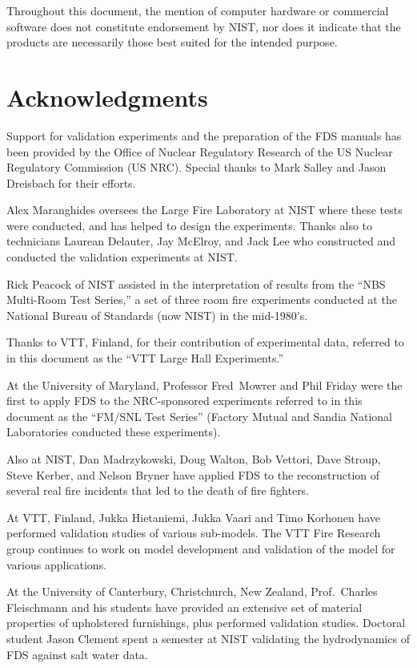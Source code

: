 \documentclass[11pt]{book}
\begin{document}
Throughout this document, the mention of computer hardware or commercial
software does not constitute endorsement by NIST, nor does it indicate that
the products are necessarily those best suited for the intended purpose.


\chapter{Acknowledgments}

\label{acksection}

Support for validation experiments and the preparation of the FDS
manuals has been provided by the Office of Nuclear Regulatory Research
of the US Nuclear Regulatory Commission (US NRC). Special thanks to
Mark Salley and Jason Dreisbach for their efforts.

Alex Maranghides oversees the Large Fire Laboratory at NIST where
these tests were conducted, and has helped to design the
experiments. Thanks also to technicians Laurean Delauter, Jay McElroy,
and Jack Lee who constructed and conducted the validation experiments
at NIST.

Rick Peacock of NIST assisted in the interpretation of results from
the ``NBS Multi-Room Test Series,'' a set of three room
fire experiments conducted at the National Bureau of Standards (now
NIST) in the mid-1980's.

Thanks to VTT, Finland, for their contribution of experimental data,
referred to in this document as the ``VTT Large Hall Experiments.''

At the University of Maryland, Professor Fred~Mowrer and Phil Friday
were the first to apply FDS to the NRC-sponsored experiments referred
to in this document as the ``FM/SNL Test Series'' (Factory Mutual and
Sandia National Laboratories conducted these experiments).

Also at NIST, Dan Madrzykowski, Doug Walton, Bob Vettori, Dave Stroup,
Steve Kerber, and Nelson Bryner have applied FDS to the reconstruction
of several real fire incidents that led to the death of fire fighters.

At VTT, Finland, Jukka Hietaniemi, Jukka Vaari and Timo Korhonen have
performed validation studies of various sub-models. The VTT Fire
Research group continues to work on model development and
validation of the model for various applications.

At the University of Canterbury, Christchurch, New Zealand,
Prof.~Charles Fleischmann and his students have provided an extensive
set of material properties of upholstered furnishings, plus performed
validation studies. Doctoral student Jason Clement spent a semester at
NIST validating the hydrodynamics of FDS against salt water data.
\end{document}
